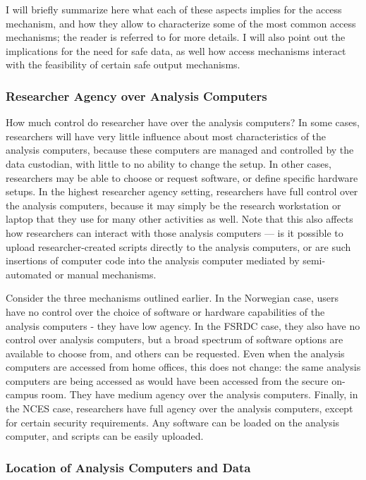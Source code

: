 I will briefly summarize here what each of these aspects implies for the access mechanism, and how they allow to characterize some of the most common access mechanisms; the reader is referred to \cite{shen_physically_2021} for more details. I will also point out the implications for the need for safe data, as well how access mechanisms interact with the feasibility of certain safe output mechanisms.


\subsubsection{Researcher Agency over Analysis Computers}

How much control do researcher have over the analysis computers? In some cases, researchers will have very little influence about most characteristics of the analysis computers, because these computers are managed and controlled by the data custodian, with little to no ability to change the setup. In other cases, researchers may be able to choose or request software, or define specific hardware setups. In the highest researcher agency setting, researchers have full control over the analysis computers, because it may simply be the research workstation or laptop that they use for many other activities as well. Note that this also affects how researchers can interact with those analysis computers --- is it possible to upload researcher-created scripts directly to the analysis computers, or are such insertions of computer code into the analysis computer mediated by semi-automated or manual mechanisms. 

Consider the three mechanisms outlined earlier. In the Norwegian case, users have no control over the choice of software or hardware capabilities of the analysis computers - they have low agency. In the FSRDC case, they also have no control over analysis computers, but a broad spectrum of software options are available to choose from, and others can be requested. Even when the analysis computers are accessed from home offices, this does not change: the same analysis computers are being accessed as would have been accessed from the secure on-campus room. They have medium agency over the analysis computers. Finally, in the NCES case, researchers have full agency over the analysis computers, except for certain security requirements. Any software can be loaded on the analysis computer, and scripts can be easily uploaded.

\subsubsection{Location of Analysis Computers and Data}

